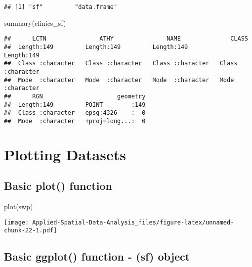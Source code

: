 \documentclass[
]{book}
\newenvironment{Shaded}{\begin{snugshade}}{\end{snugshade}}
\newcommand{\FunctionTok}[1]{\textcolor[rgb]{0.00,0.00,0.00}{#1}}
\newcommand{\NormalTok}[1]{#1}
\begin{document}
\begin{verbatim}
## [1] "sf"         "data.frame"
\end{verbatim}

\begin{Shaded}
\begin{Highlighting}[]
\FunctionTok{summary}\NormalTok{(clinics\_sf)}
\end{Highlighting}
\end{Shaded}

\begin{verbatim}
##      LCTN               ATHY               NAME              CLASS          
##  Length:149         Length:149         Length:149         Length:149        
##  Class :character   Class :character   Class :character   Class :character  
##  Mode  :character   Mode  :character   Mode  :character   Mode  :character  
##      RGN                     geometry  
##  Length:149         POINT        :149  
##  Class :character   epsg:4326    :  0  
##  Mode  :character   +proj=long...:  0
\end{verbatim}

\hypertarget{plotting-datasets}{%
\section{Plotting Datasets}\label{plotting-datasets}}

\hypertarget{basic-plot-function}{%
\subsection{Basic plot() function}\label{basic-plot-function}}

\begin{Shaded}
\begin{Highlighting}[]
\FunctionTok{plot}\NormalTok{(swp)}
\end{Highlighting}
\end{Shaded}

\texttt{[image: Applied-Spatial-Data-Analysis\_files/figure-latex/unnamed-chunk-22-1.pdf]}

\hypertarget{basic-ggplot-function---sf-object}{%
\subsection{Basic ggplot() function - (sf) object}\label{basic-ggplot-function---sf-object}}
\end{document}
